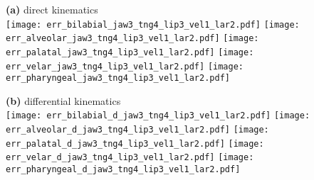 \documentclass[varwidth=7.5in]{standalone}
\begin{document}
\raggedright

{\bf (a)} direct kinematics\\
\texttt{[image: err\_bilabial\_jaw3\_tng4\_lip3\_vel1\_lar2.pdf]}%
\texttt{[image: err\_alveolar\_jaw3\_tng4\_lip3\_vel1\_lar2.pdf]}%
\texttt{[image: err\_palatal\_jaw3\_tng4\_lip3\_vel1\_lar2.pdf]}%
\texttt{[image: err\_velar\_jaw3\_tng4\_lip3\_vel1\_lar2.pdf]}%
\texttt{[image: err\_pharyngeal\_jaw3\_tng4\_lip3\_vel1\_lar2.pdf]}

{\bf (b)} differential kinematics\\
\texttt{[image: err\_bilabial\_d\_jaw3\_tng4\_lip3\_vel1\_lar2.pdf]}%
\texttt{[image: err\_alveolar\_d\_jaw3\_tng4\_lip3\_vel1\_lar2.pdf]}%
\texttt{[image: err\_palatal\_d\_jaw3\_tng4\_lip3\_vel1\_lar2.pdf]}%
\texttt{[image: err\_velar\_d\_jaw3\_tng4\_lip3\_vel1\_lar2.pdf]}%
\texttt{[image: err\_pharyngeal\_d\_jaw3\_tng4\_lip3\_vel1\_lar2.pdf]}
\end{document}
